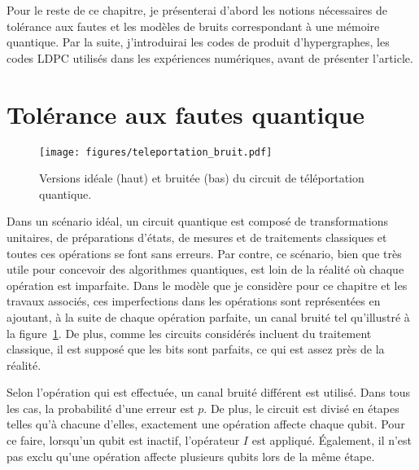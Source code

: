 Pour le reste de ce chapitre,
je présenterai d'abord les notions nécessaires de tolérance aux fautes et les modèles 
de bruits correspondant à une mémoire quantique.
Par la suite,
j'introduirai les codes de produit d'hypergraphes,
les codes LDPC utilisés dans les expériences numériques,
avant de présenter l'article.

\section{Tolérance aux fautes quantique}

\begin{figure}
	\begin{center}
		\texttt{[image: figures/teleportation\_bruit.pdf]}
	\end{center}
	\caption{
		Versions idéale (haut) et bruitée (bas) du circuit de téléportation quantique.
	}
	\label{fig:teleportation_bruit}
\end{figure}

Dans un scénario idéal,
un circuit quantique est composé de transformations unitaires,
de préparations d'états, de mesures et de traitements classiques et toutes ces opérations
se font sans erreurs.
Par contre,
ce scénario,
bien que très utile pour concevoir des algorithmes quantiques,
est loin de la réalité où chaque opération est imparfaite.
Dans le modèle que je considère pour ce chapitre et les travaux associés,
ces imperfections dans les opérations sont représentées en ajoutant,
à la suite de chaque opération parfaite,
un canal bruité tel qu'illustré à la figure~\ref{fig:teleportation_bruit}.
De plus,
comme les circuits considérés incluent du traitement classique,
il est supposé que les bits sont parfaits,
ce qui est assez près de la réalité.

Selon l'opération qui est effectuée,
un canal bruité différent est utilisé.
Dans tous les cas,
la probabilité d'une erreur est $p$.
De plus, 
le circuit est divisé en étapes telles qu'à chacune d'elles,
exactement une opération affecte chaque qubit.
Pour ce faire,
lorsqu'un qubit est inactif,
l'opérateur $I$ est appliqué.
Également,
il n'est pas exclu qu'une opération affecte plusieurs qubits lors de la même étape.

